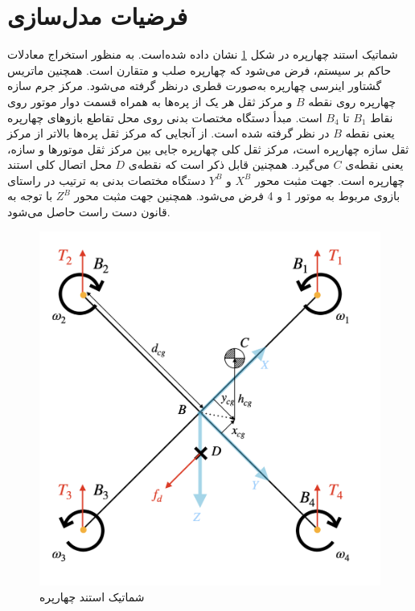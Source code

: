 \section{فرضیات مدل‌سازی}\label{sec_modelassum}
شماتیک استند چهارپره در شكل \ref{QuadAssum} نشان داده شده‌است. به ‌منظور استخراج معادلات حاکم بر سیستم، 
فرض می‌شود که چهارپره صلب و متقارن است. همچنین ماتریس گشتاور اینرسی چهارپره به‌صورت قطری درنظر گرفته می‌شود. مرکز جرم سازه چهارپره روی نقطه $B$ و مرکز ثقل هر یک از پره‌ها به همراه قسمت دوار موتور روی نقاط 
$B_1$
تا
$B_4$
است. مبدأ دستگاه مختصات بدنی روی محل تقاطع بازوهای چهارپره یعنی نقطه 
$B$
در نظر گرفته شده است. از آنجایی ‌که مرکز ثقل پره‌ها بالاتر از مرکز ثقل سازه چهارپره است، مرکز ثقل کلی چهارپره جایی بین مرکز ثقل موتورها و سازه، یعنی نقطه‌ی 
$C$
می‌گیرد. همچنین قابل ذکر است که نقطه‌ی
$D$
محل اتصال کلی استند چهارپره است. جهت مثبت محور 
$X^B$
و
$Y^B$
دستگاه مختصات بدنی به ترتیب در راستای بازوی مربوط به موتور 1 و 4 فرض می‌شود. همچنین جهت مثبت محور
$Z^B$
با توجه به قانون دست راست حاصل می‌شود.
\begin{figure}[H]
	\includegraphics[width=12cm]{../Figures/Forces/StandAssumations.png}
	\centering
	\caption{شماتیک استند چهارپره}
	\label{QuadAssum}
\end{figure}